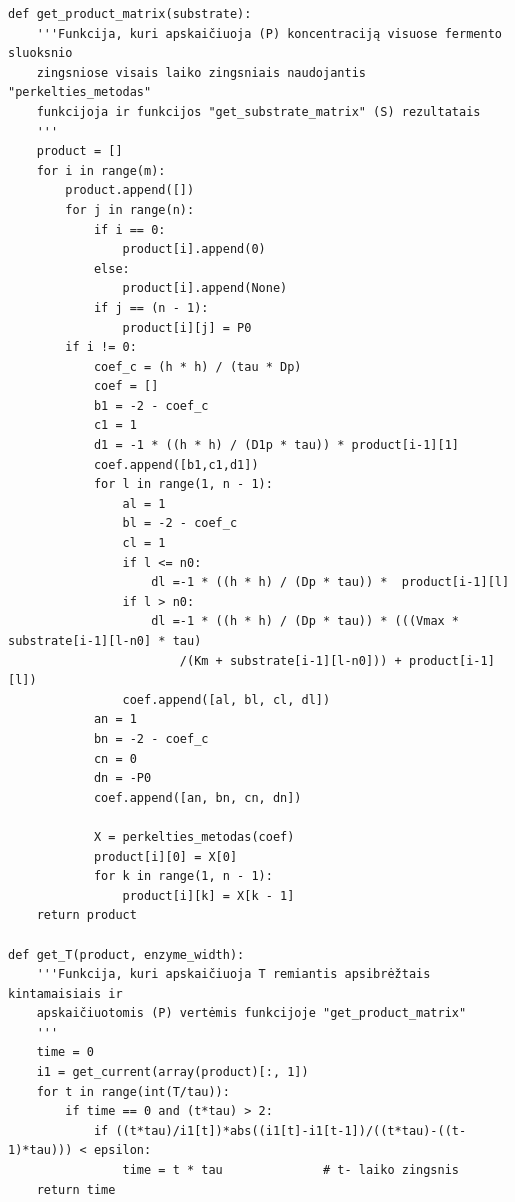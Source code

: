 \documentclass[12pt, a4paper, lithuanian]{article}
\begin{document}
\begin{verbatim}
def get_product_matrix(substrate):
    '''Funkcija, kuri apskaičiuoja (P) koncentraciją visuose fermento sluoksnio
    zingsniose visais laiko zingsniais naudojantis "perkelties_metodas"
    funkcijoja ir funkcijos "get_substrate_matrix" (S) rezultatais
    '''
    product = []
    for i in range(m):
        product.append([])
        for j in range(n):
            if i == 0:
                product[i].append(0)
            else:
                product[i].append(None)
            if j == (n - 1):
                product[i][j] = P0
        if i != 0:
            coef_c = (h * h) / (tau * Dp)
            coef = []
            b1 = -2 - coef_c
            c1 = 1
            d1 = -1 * ((h * h) / (D1p * tau)) * product[i-1][1]
            coef.append([b1,c1,d1])
            for l in range(1, n - 1):
                al = 1
                bl = -2 - coef_c
                cl = 1
                if l <= n0:
                    dl =-1 * ((h * h) / (Dp * tau)) *  product[i-1][l]
                if l > n0:
                    dl =-1 * ((h * h) / (Dp * tau)) * (((Vmax * substrate[i-1][l-n0] * tau)
                        /(Km + substrate[i-1][l-n0])) + product[i-1][l])
                coef.append([al, bl, cl, dl])
            an = 1
            bn = -2 - coef_c
            cn = 0
            dn = -P0
            coef.append([an, bn, cn, dn])

            X = perkelties_metodas(coef)
            product[i][0] = X[0]
            for k in range(1, n - 1):
                product[i][k] = X[k - 1]
    return product

def get_T(product, enzyme_width):
    '''Funkcija, kuri apskaičiuoja T remiantis apsibrėžtais kintamaisiais ir
    apskaičiuotomis (P) vertėmis funkcijoje "get_product_matrix"
    '''
    time = 0
    i1 = get_current(array(product)[:, 1])
    for t in range(int(T/tau)):
        if time == 0 and (t*tau) > 2:
            if ((t*tau)/i1[t])*abs((i1[t]-i1[t-1])/((t*tau)-((t-1)*tau))) < epsilon:
                time = t * tau              # t- laiko zingsnis
    return time


\end{verbatim}
\end{document}

